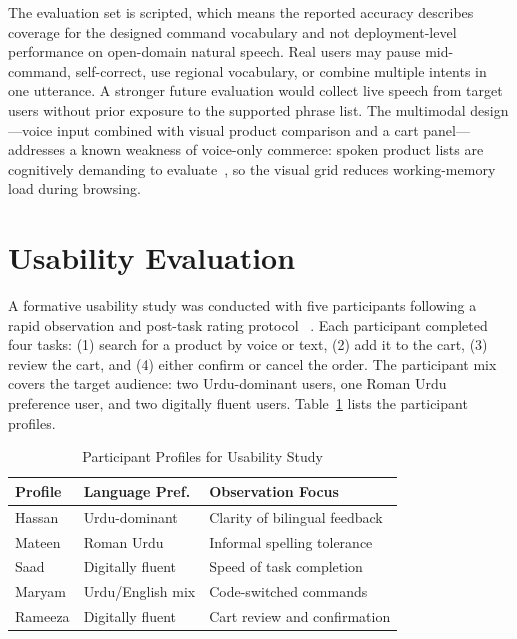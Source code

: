 \documentclass[conference]{IEEEtran}
\begin{document}
The evaluation set is scripted, which means the reported accuracy
describes coverage for the designed command vocabulary and not
deployment-level performance on open-domain natural speech. Real users
may pause mid-command, self-correct, use regional vocabulary, or
combine multiple intents in one utterance. A stronger future evaluation
would collect live speech from target users without prior exposure to
the supported phrase list. The multimodal design---voice input combined
with visual product comparison and a cart panel---addresses a known
weakness of voice-only commerce: spoken product lists are cognitively
demanding to evaluate~\cite{ocon2020overload}, so the visual grid
reduces working-memory load during browsing.

\section{Usability Evaluation}

A formative usability study was conducted with five participants
following a rapid observation and post-task rating protocol~%
\cite{murad2023guidelines,amershi2019guidelines}. Each participant
completed four tasks: (1) search for a product by voice or text,
(2) add it to the cart, (3) review the cart, and
(4) either confirm or cancel the order.
The participant mix covers the target audience: two Urdu-dominant
users, one Roman Urdu preference user, and two digitally fluent
users. Table~\ref{tab:participants} lists the participant profiles.

\begin{table}[t]
\caption{Participant Profiles for Usability Study}
\label{tab:participants}
\centering
\renewcommand{\arraystretch}{1.1}
\begin{tabular}{p{} p{} p{}}
\toprule
\textbf{Profile} & \textbf{Language Pref.} & \textbf{Observation Focus} \\
\midrule
Hassan  & Urdu-dominant   & Clarity of bilingual feedback \\
Mateen  & Roman Urdu      & Informal spelling tolerance \\
Saad    & Digitally fluent & Speed of task completion \\
Maryam  & Urdu/English mix & Code-switched commands \\
Rameeza & Digitally fluent & Cart review and confirmation \\
\bottomrule
\end{tabular}
\end{table}
\end{document}
